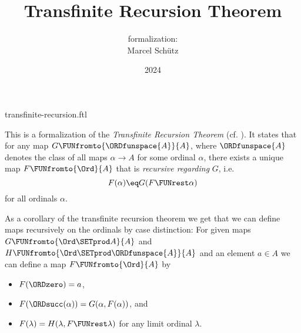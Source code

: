 \documentclass{article}
\title{Transfinite Recursion Theorem}
\author{\Naproche formalization:\\[0.5em]Marcel Schütz}
\date{2024}
\begin{document}
\begin{smodule}{transfinite-recursion.ftl}
  \maketitle

  
  \noindent This is a formalization of the \emph{Transfinite Recursion Theorem}
  (cf. \cite{Koepke2018}).
  It states that for any map $G \FUNfromto{\ORDfunspace{A}}{A}$, where
  $\ORDfunspace{A}$ denotes the class of all maps $\alpha \to A$ for some
  ordinal $\alpha$, there exists a unique map $F \FUNfromto{\Ord}{A}$ that is
  \emph{recursive regarding} $G$, i.e. \[F(\alpha) \eq G(F \FUNrest \alpha)\] for
  all ordinals $\alpha$.

  

  As a corollary of the transfinite recursion theorem we get that we can
  define maps recursively on the ordinals by case distinction:
  For given maps $G \FUNfromto{\Ord \SETprod A}{A}$ and
  $H \FUNfromto{\Ord \SETprod \ORDfunspace{A}}{A}$ and an element $a \in A$ we
  can define a map $F \FUNfromto{\Ord}{A}$ by
  \begin{itemize}
    \item $F(\ORDzero) = a$,
    \item $F(\ORDsucc(\alpha)) = G(\alpha, F(\alpha))$, and
    \item $F(\lambda) = H(\lambda, F \FUNrest \lambda)$
      for any limit ordinal $\lambda$.
  \end{itemize}


  \printbibliography
\end{smodule}
\end{document}
